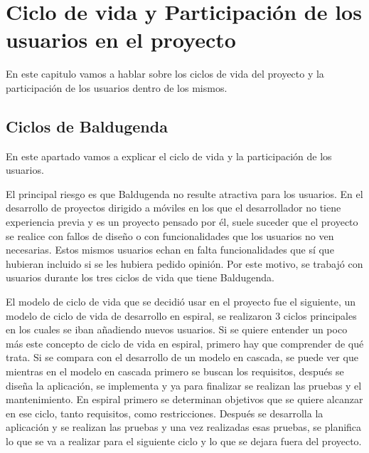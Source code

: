 \chapter{Ciclo de vida y Participación de los usuarios en el proyecto}
\label{ch:ciclo de vida}



En este capitulo vamos a hablar sobre los ciclos de vida del proyecto y la participación de los usuarios dentro de los mismos.

\section{Ciclos de Baldugenda}
\label{secc:ciclos de Baldugenda}

En este apartado vamos a explicar el ciclo de vida y la participación de los usuarios. 

El principal riesgo es que Baldugenda no resulte atractiva para los usuarios. En el desarrollo de proyectos dirigido a móviles en los que el desarrollador no tiene experiencia previa y es un proyecto pensado por él, suele suceder que el proyecto se realice con fallos de diseño o con funcionalidades que los usuarios no ven necesarias. Estos mismos usuarios echan en falta funcionalidades que sí que hubieran incluido si se les hubiera pedido opinión. 
Por este motivo, se trabajó con usuarios durante los tres ciclos de vida que tiene Baldugenda.

El modelo de ciclo de vida que se decidió usar en el proyecto fue el siguiente, un modelo de ciclo de vida de desarrollo en espiral, se realizaron 3 ciclos principales en los cuales se iban añadiendo nuevos usuarios.
Si se quiere entender un poco más este concepto de ciclo de vida en espiral, primero hay que comprender de qué trata. Si se compara con el desarrollo de un modelo en cascada, se puede ver que mientras en el modelo en cascada primero se buscan los requisitos, después se diseña la aplicación, se implementa y ya para finalizar se realizan las pruebas y el mantenimiento. 
En espiral primero se determinan objetivos que se quiere alcanzar en ese ciclo, tanto requisitos, como restricciones. Después se desarrolla la aplicación y se realizan las pruebas y una vez realizadas esas pruebas, se planifica lo que se va a realizar para el siguiente ciclo y lo que se dejara fuera del proyecto. 

